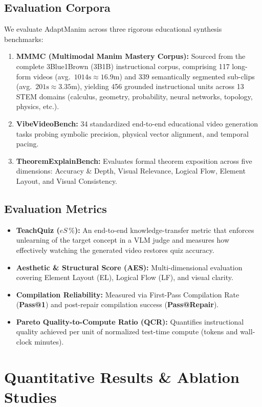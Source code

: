 \documentclass[11pt, a4paper]{article}
\begin{document}
\subsection{Evaluation Corpora}
We evaluate AdaptManim across three rigorous educational synthesis benchmarks:
\begin{enumerate}[leftmargin=*]
    \item \textbf{MMMC (Multimodal Manim Mastery Corpus):} Sourced from the complete 3Blue1Brown (3B1B) instructional corpus, comprising 117 long-form videos (avg.\ $1014\text{s} \approx 16.9\text{m}$) and 339 semantically segmented sub-clips (avg.\ $201\text{s} \approx 3.35\text{m}$), yielding 456 grounded instructional units across 13 STEM domains (calculus, geometry, probability, neural networks, topology, physics, etc.).
    \item \textbf{VibeVideoBench:} 34 standardized end-to-end educational video generation tasks probing symbolic precision, physical vector alignment, and temporal pacing.
    \item \textbf{TheoremExplainBench:} Evaluates formal theorem exposition across five dimensions: Accuracy \& Depth, Visual Relevance, Logical Flow, Element Layout, and Visual Consistency.
\end{enumerate}

\subsection{Evaluation Metrics}
\begin{itemize}[leftmargin=*]
    \item \textbf{TeachQuiz ($eS\,\%$):} An end-to-end knowledge-transfer metric that enforces unlearning of the target concept in a VLM judge and measures how effectively watching the generated video restores quiz accuracy.
    \item \textbf{Aesthetic \& Structural Score (AES):} Multi-dimensional evaluation covering Element Layout (EL), Logical Flow (LF), and visual clarity.
    \item \textbf{Compilation Reliability:} Measured via First-Pass Compilation Rate (\textbf{Pass@1}) and post-repair compilation success (\textbf{Pass@Repair}).
    \item \textbf{Pareto Quality-to-Compute Ratio (QCR):} Quantifies instructional quality achieved per unit of normalized test-time compute (tokens and wall-clock minutes).
\end{itemize}

\section{Quantitative Results \& Ablation Studies}
\end{document}
